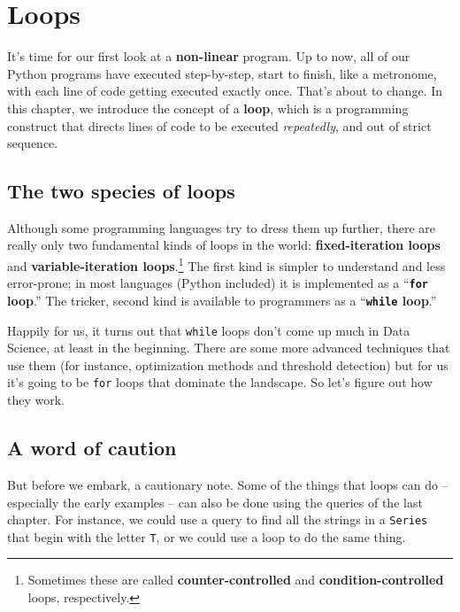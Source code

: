 
\chapter{Loops}
\label{ch:loops}


It's time for our first look at a \textbf{non-linear} program. Up to now, all
of our Python programs have executed step-by-step, start to finish, like a
metronome, with each line of code getting executed exactly once. That's about
to change. In this chapter, we introduce the concept of a \textbf{loop}, which
is a programming construct that directs lines of code to be executed
\textit{repeatedly}, and out of strict sequence.

\section{The two species of loops}


Although some programming languages try to dress them up further, there are
really only two fundamental kinds of loops in the world:
\textbf{fixed-iteration loops} and \textbf{variable-iteration
loops}.\footnote{Sometimes these are called \textbf{counter-controlled} and
\textbf{condition-controlled} loops, respectively.} The first kind is simpler
to understand and less error-prone; in most languages (Python included) it is
implemented as a ``\textbf{\texttt{for} loop}.'' The tricker, second kind is
available to programmers as a ``\textbf{\texttt{while} loop}.''

Happily for us, it turns out that \texttt{while} loops don't come up much in
Data Science, at least in the beginning. There are some more advanced
techniques that use them (for instance, optimization methods and threshold
detection) but for us it's going to be \texttt{for} loops that dominate the
landscape. So let's figure out how they work.

\section{A word of caution}


But before we embark, a cautionary note. Some of the things that loops can do
-- especially the early examples -- can also be done using the queries of the
last chapter. For instance, we could use a query to find all the strings in a
\texttt{Series} that begin with the letter \texttt{T}, or we could use a loop
to do the same thing.

